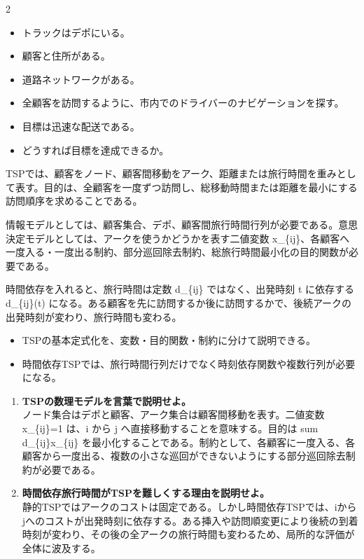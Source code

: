 \clearpage
{}
\begin{multicols}{2}\footnotesize\raggedcolumns
{}
\begin{itemize}
\item トラックはデポにいる。
\item 顧客と住所がある。
\item 道路ネットワークがある。
\item 全顧客を訪問するように、市内でのドライバーのナビゲーションを探す。
\item 目標は迅速な配送である。
\item どうすれば目標を達成できるか。
\end{itemize}
TSPでは、顧客をノード、顧客間移動をアーク、距離または旅行時間を重みとして表す。目的は、全顧客を一度ずつ訪問し、総移動時間または距離を最小にする訪問順序を求めることである。\par

情報モデルとしては、顧客集合、デポ、顧客間旅行時間行列が必要である。意思決定モデルとしては、アークを使うかどうかを表す二値変数 x\_\{ij\}、各顧客へ一度入る・一度出る制約、部分巡回除去制約、総旅行時間最小化の目的関数が必要である。\par

時間依存を入れると、旅行時間は定数 d\_\{ij\} ではなく、出発時刻 t に依存する d\_\{ij\}(t) になる。ある顧客を先に訪問するか後に訪問するかで、後続アークの出発時刻が変わり、旅行時間も変わる。\par
{}
\begin{itemize}
\item TSPの基本定式化を、変数・目的関数・制約に分けて説明できる。
\item 時間依存TSPでは、旅行時間行列だけでなく時刻依存関数や複数行列が必要になる。
\end{itemize}
\begin{enumerate}
\item \textbf{TSPの数理モデルを言葉で説明せよ。}\\ノード集合はデポと顧客、アーク集合は顧客間移動を表す。二値変数 x\_\{ij\}=1 は、i から j へ直接移動することを意味する。目的は sum d\_\{ij\}x\_\{ij\} を最小化することである。制約として、各顧客に一度入る、各顧客から一度出る、複数の小さな巡回ができないようにする部分巡回除去制約が必要である。
\item \textbf{時間依存旅行時間がTSPを難しくする理由を説明せよ。}\\静的TSPではアークのコストは固定である。しかし時間依存TSPでは、iからjへのコストが出発時刻に依存する。ある挿入や訪問順変更により後続の到着時刻が変わり、その後の全アークの旅行時間も変わるため、局所的な評価が全体に波及する。
\end{enumerate}
\end{multicols}

